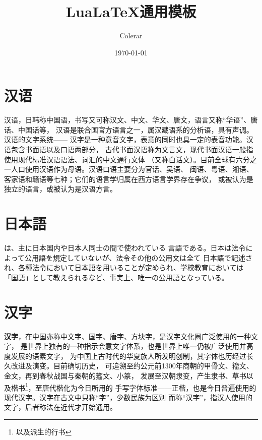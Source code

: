 \documentclass[
  fontset = none,
  punct   = kaiming,
]{ctexart}
\author{Colerar}
\date{\today}
\title{Lua\LaTeX{}通用模板}
\renewcommand{\emph}[1]{\textbf{#1}}
\begin{document}
\maketitle

{
  \hypersetup{linkcolor=black}
  \tableofcontents
}

\newpage
\sans
\section{汉语}

汉语，日韩称中国语，书写又可称汉文、中文、华文、唐文，语言又称“华语”、唐话、中国话等，
汉语是联合国官方语言之一，属汉藏语系的分析语，具有声调。汉语的文字系统——
汉字是一种意音文字，表意的同时也具一定的表音功能。汉语包含书面语以及口语两部分，
古代书面汉语称为文言文，现代书面汉语一般指使用现代标准汉语语法、词汇的中文通行文体
（又称白话文）。目前全球有六分之一人口使用汉语作为母语。汉语口语主要分为官话、吴语、
闽语、粤语、湘语、客家语和赣语等七种；它们的语言学归属在西方语言学界存在争议，
或被认为是独立的语言，或被认为是汉语方言。


\newpage
\section[日本語]{\gothic 日本語 }

\mincho

\emph{}は、主に日本国内や日本人同士の間で使われている
言語である。日本は法令によって公用語を規定していないが、法令その他の公用文は全て
日本語で記述され、各種法令において日本語を用いることが定められ、学校教育においては
「国語」として教えられるなど、事実上、唯一の公用語となっている。


\newpage
\sans
\section{汉字}

\emph{汉字}，在中国亦称中文字、国字、唐字、方块字，是汉字文化圈广泛使用的一种文字，
是世界上独有的一种指示会意文字体系，也是世界上唯一仍被广泛使用并高度发展的语素文字，
为中国上古时代的华夏族人所发明创制，其字体也历经过长久改进及演变。目前确切历史，
可追溯至约公元前1300年商朝的甲骨文、籀文、金文，再到春秋战国与秦朝的籀文、小篆，
发展至汉朝隶变，产生隶书、草书以及楷书\footnote{以及派生的行书}，至唐代楷化为今日所用的
手写字体标准——正楷，也是今日普遍使用的现代汉字。汉字在古文中只称“字”，少数民族为区别
而称“汉字”，指汉人使用的文字，后者称法在近代才开始通用。
\end{document}
